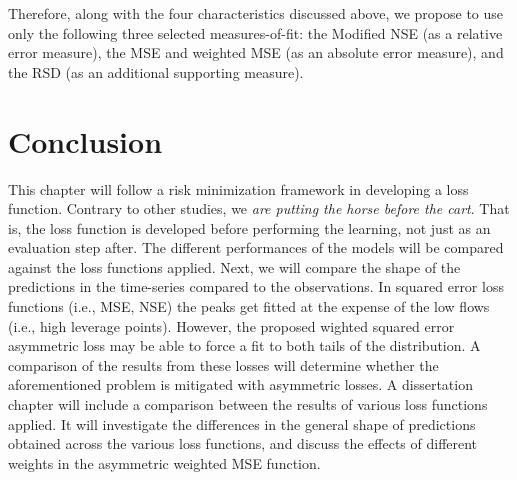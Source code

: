 Therefore, along with the four characteristics discussed above, we propose to use only the following three selected measures-of-fit: the Modified NSE (as a relative error measure), the MSE and weighted MSE (as an absolute error measure), and the RSD (as an additional supporting measure). 


\section{Conclusion} \label{ch4: conclusion}
This chapter will follow a risk minimization framework in developing a loss function. Contrary to other studies, we \textit{are putting the horse before the cart}. That is, the loss function is developed before performing the learning, not just as an evaluation step after. The different performances of the models will be compared against the loss functions applied. Next, we will compare the shape of the predictions in the time-series compared to the observations. In squared error loss functions (i.e., MSE, NSE) the peaks get fitted at the expense of the low flows (i.e., high leverage points). However, the proposed wighted squared error asymmetric loss may be able to force a fit to both tails of the distribution. A comparison of the results from these losses will determine whether the aforementioned problem is mitigated with asymmetric losses. A dissertation chapter will include a comparison between the results of various loss functions applied. It will investigate the differences in the general shape of predictions obtained across the various loss functions, and discuss the effects of different weights in the asymmetric weighted MSE function.   


